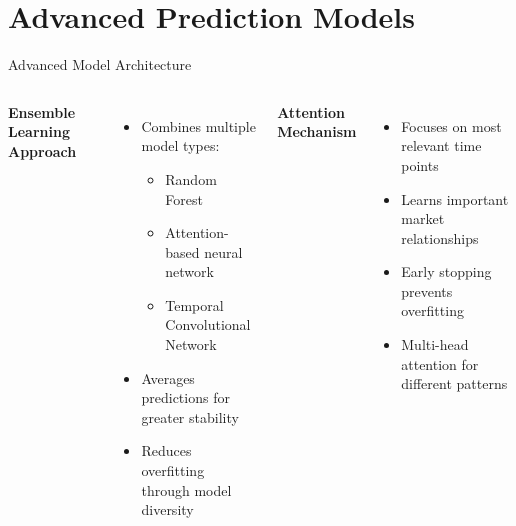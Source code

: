 \documentclass[aspectratio=169,xcolor=dvipsnames]{beamer}
\begin{document}
\section{Advanced Prediction Models}
\begin{frame}{Advanced Model Architecture}
	\begin{columns}[c]
		\textbf{Ensemble Learning Approach}
		\begin{itemize}
			\item Combines multiple model types:
			      \begin{itemize}
				      \item Random Forest
				      \item Attention-based neural network
				      \item Temporal Convolutional Network
			      \end{itemize}
			\item Averages predictions for greater stability
			\item Reduces overfitting through model diversity
		\end{itemize}

		\textbf{Attention Mechanism}
		\begin{itemize}
			\item Focuses on most relevant time points
			\item Learns important market relationships
			\item Early stopping prevents overfitting
			\item Multi-head attention for different patterns
		\end{itemize}
	\end{columns}
\end{frame}
\end{document}
